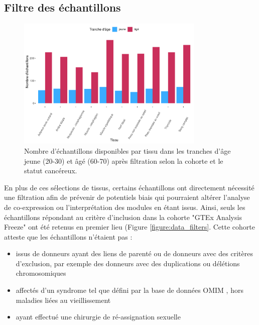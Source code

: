 \subsection{Filtre des échantillons}

\begin{figure}[hb]
    \centering
    \includegraphics[width=0.8\textwidth]{img/chap2/chap2_sample_count_by_tissu_after_filter.pdf}
    \caption{Nombre d'échantillons disponibles par tissu dans les tranches d'âge jeune (20-30) et âgé (60-70) après filtration selon la cohorte et le statut cancéreux.}
    \label{figure:sample_count_by_tissu_after_filter}
\end{figure}

En plus de ces sélections de tissus, certains échantillons ont directement nécessité une filtration afin de prévenir de potentiels biais qui pourraient altérer l'analyse de co-expression ou l'interprétation des modules en étant issus. Ainsi, seuls les échantillons répondant au critère d'inclusion dans la cohorte "GTEx Analysis Freeze" ont été retenus en premier lieu (Figure \ref{figure:data_filters}. Cette cohorte atteste que les échantillons n'étaient pas :
\begin{itemize}
    \item issus de donneurs ayant des liens de parenté ou de donneurs avec des critères d'exclusion, par exemple des donneurs avec des duplications ou délétions chromosomiques
    \item affectés d'un syndrome tel que défini par la base de données OMIM , hors maladies liées au vieillissement
    \item ayant effectué une chirurgie de ré-assignation sexuelle
\end{itemize}

